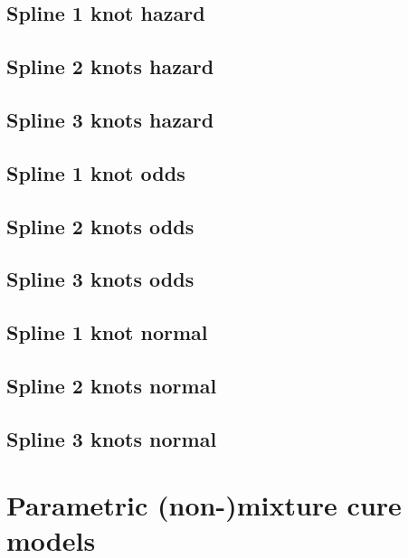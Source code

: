 \documentclass[]{article}
\begin{document}
\subsection{Spline 1 knot hazard}\label{spline-1-knot-hazard}

\subsection{Spline 2 knots hazard}\label{spline-2-knots-hazard}

\subsection{Spline 3 knots hazard}\label{spline-3-knots-hazard}

\subsection{Spline 1 knot odds}\label{spline-1-knot-odds}

\subsection{Spline 2 knots odds}\label{spline-2-knots-odds}

\subsection{Spline 3 knots odds}\label{spline-3-knots-odds}

\subsection{Spline 1 knot normal}\label{spline-1-knot-normal}

\subsection{Spline 2 knots normal}\label{spline-2-knots-normal}

\subsection{Spline 3 knots normal}\label{spline-3-knots-normal}

\newpage

\section{Parametric (non-)mixture cure
models}\label{parametric-non-mixture-cure-models}
\end{document}
